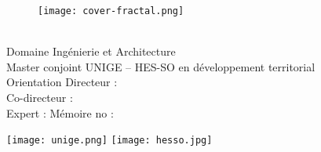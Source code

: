 
\begin{titlepage}
    \begin{flushleft}
        \begin{figure}[ht]
            \centering
            \begin{minipage}[b]{0.98\textwidth}
                \texttt{[image: cover-fractal.png]}
            \end{minipage}%
            \begin{minipage}[b]{0.02\textwidth}
                \hfill %
                \vspace*{\fill}
            \end{minipage}
        \end{figure}
        \vspace{0.5cm}
        {\huge \bfseries \titre} 
        \vfill
        {\huge \textbf{\auteur}} 
        \vfill
        {\Large \textbf{\dateTM} \\
        {\Large Domaine Ingénierie et Architecture} \\
        {\large Master conjoint UNIGE -- HES-SO en développement territorial} \\
        {\large Orientation \orientation}
        \vfill
        \small 
        Directeur : \directeur \\
        Co-directeur : \codirecteur \\
        Expert : \expert} 
        \vfill
        \small Mémoire no : \numeroTM 
    \end{flushleft}
    \vfill
    \texttt{[image: unige.png]}
    \hspace{1.5cm}
    \texttt{[image: hesso.jpg]}
    \vfill
\end{titlepage}